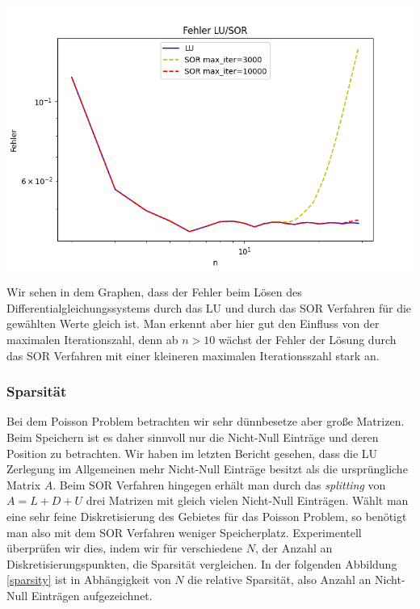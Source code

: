 \documentclass[smallheadings]{scrartcl}
\theoremstyle{definition}
\begin{document}
\begin{minipage}{\textwidth}

 \centering
 \includegraphics[scale = 0.8]{Errorlu1}
 	\label{errorcomp}

 \end{minipage}
 
 Wir sehen in dem Graphen, dass der Fehler beim Lösen des Differentialgleichungssystems durch das LU und durch das SOR Verfahren für die gewählten Werte gleich ist.  Man erkennt aber hier gut den Einfluss von der maximalen Iterationszahl, denn ab $n>10$ wächst der Fehler der Lösung durch das SOR Verfahren mit einer kleineren maximalen Iterationsszahl stark an.
 
 

\subsubsection{Sparsität}
Bei dem Poisson Problem betrachten wir sehr dünnbesetze aber große Matrizen.  Beim Speichern ist es daher sinnvoll nur die Nicht-Null Einträge und deren Position zu betrachten.  Wir haben im letzten Bericht gesehen,  dass die LU Zerlegung im Allgemeinen mehr Nicht-Null Einträge besitzt als die ursprüngliche Matrix $A$.  Beim SOR Verfahren hingegen erhält man durch das \textit{splitting} von $A=L+D+U$ drei Matrizen mit gleich vielen Nicht-Null Einträgen.  Wählt man eine sehr feine Diskretisierung des Gebietes für das Poisson Problem,  so benötigt man also mit dem SOR Verfahren weniger Speicherplatz.   Experimentell überprüfen wir dies, indem wir für verschiedene $N$, der Anzahl an Diskretisierungspunkten, die Sparsität vergleichen. 
In der folgenden Abbildung \ref{sparsity} ist in Abhängigkeit von $N$ die relative Sparsität, also Anzahl an Nicht-Null Einträgen aufgezeichnet. 
\end{document}
